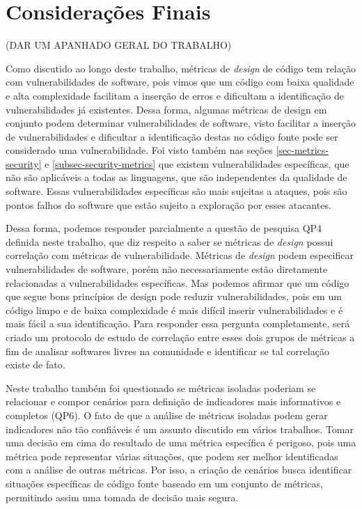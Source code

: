 \chapter{Considerações Finais}
\label{cap-consideracoesFinais}


(DAR UM APANHADO GERAL DO TRABALHO)



Como discutido ao longo deste trabalho, métricas de \emph{design} de código tem relação com  vulnerabilidades de software, pois vimos que um código com baixa qualidade e alta complexidade facilitam a inserção de erros e dificultam a identificação de vulnerabilidades já existentes. Dessa forma, algumas métricas de design em conjunto podem determinar vulnerabilidades de software, visto facilitar a inserção de vulnerabilidades e dificultar a identificação destas no código fonte pode ser considerado uma vulnerabilidade. Foi visto também nas seções \ref{sec-metrics-security} e \ref{subsec-security-metrics} que existem vulnerabilidades específicas, que não são aplicáveis a todas as linguagens, que são independentes da qualidade de software. Essas vulnerabilidades específicas são mais sujeitas a ataques, pois são pontos falhos do software que estão sujeito a exploração por esses atacantes. 

%

Dessa forma, podemos responder parcialmente a questão de pesquisa QP4 definida neste trabalho, que diz respeito a saber se métricas de \emph{design} possui correlação com métricas de vulnerabilidade. Métricas de \emph{design} podem especificar vulnerabilidades de software, porém não necessariamente estão diretamente relacionadas a vulnerabilidades específicas. Mas podemos afirmar que um código que segue bons princípios de design pode reduzir vulnerabilidades, pois em um código limpo e de baixa complexidade é mais difícil inserir vulnerabilidades e é mais fácil a sua identificação. Para responder essa pergunta completamente, será criado um protocolo de estudo de correlação entre esses dois grupos de métricas a fim de analisar softwares livres na comunidade e identificar se tal correlação existe de fato.

%

Neste trabalho também foi questionado se métricas isoladas poderiam se relacionar e compor cenários para definição de indicadores mais informativos e completos (QP6). O fato de que a análise de métricas isoladas podem gerar indicadores não tão confiáveis é um assunto discutido em vários trabalhos. Tomar uma decisão em cima do resultado de uma métrica específica é perigoso, pois uma métrica pode representar várias situações, que podem ser melhor identificadas com a análise de outras métricas. Por isso, a criação de cenários busca identificar situações específicas de código fonte baseado em um conjunto de métricas, permitindo assim uma tomada de decisão mais segura. 

